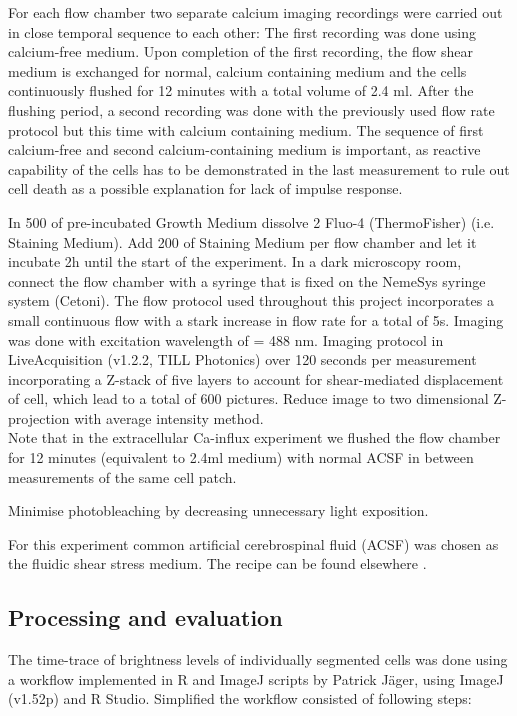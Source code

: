 For each flow chamber two separate calcium imaging recordings were carried out in close temporal sequence to each other: The first recording was done using calcium-free medium. Upon completion of the first recording, the flow shear medium is exchanged for normal, calcium containing medium and the cells continuously flushed for 12 minutes with a total volume of 2.4 ml. After the flushing period, a second recording was done with the previously used flow rate protocol but this time with calcium containing medium. The sequence of first calcium-free and second calcium-containing medium is important, as reactive capability of the cells has to be demonstrated in the last measurement to rule out cell death as a possible explanation for lack of impulse response. 

In 500\mul{} of pre-incubated Growth Medium dissolve 2\mul{} Fluo-4 (ThermoFisher) (i.e. Staining Medium). Add 200\mul{} of Staining Medium per flow chamber and let it incubate 2h until the start of the experiment. 
 In a dark microscopy room, connect the flow chamber with a syringe that is fixed on the NemeSys syringe system (Cetoni). The flow protocol used throughout this project incorporates a small continuous flow with a stark increase in flow rate for a total of 5s. Imaging was done with excitation wavelength of \textlambda{} = 488 nm. Imaging protocol in LiveAcquisition (v1.2.2, TILL Photonics) over 120 seconds per measurement incorporating a Z-stack of five layers to account for shear-mediated displacement of cell, which lead to a total of 600 pictures. Reduce image to two dimensional Z-projection with average intensity method.  \\
Note that in the extracellular Ca-influx experiment we flushed the flow chamber for 12 minutes (equivalent to 2.4ml medium) with normal ACSF in between measurements of the same cell patch.

Minimise photobleaching by decreasing unnecessary light exposition.

For this experiment common artificial cerebrospinal fluid (ACSF) was chosen as the fluidic shear stress medium. The recipe can be found elsewhere . 

\subsection{Processing and evaluation}

The time-trace of brightness levels of individually segmented cells was done using a workflow implemented in R and ImageJ scripts by Patrick Jäger, using ImageJ (v1.52p) and R Studio. Simplified the workflow consisted of following steps:

